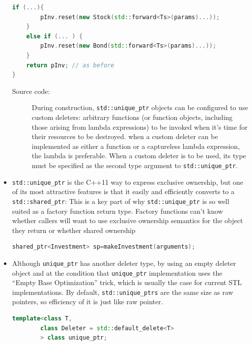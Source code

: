 \documentclass[a4paper,11pt,twoside]{book}
\begin{document}
\begin{itemize}
\begin{lstlisting}[frame=single, language=c++, mathescape=true]
	if (...){
		pInv.reset(new Stock(std::forward<Ts>(params)...));
	}
	else if (... ) {
		pInv.reset(new Bond(std::forward<Ts>(params)...));
	}
	return pInv; // as before
}
\end{lstlisting}
\begin{description}
    \item[Source code:] During construction, \texttt{std::unique\_ptr} objects can be configured to use custom deleters: arbitrary functions (or function objects, including those arising from lambda expressions) to be invoked when it's time for their resources to be destroyed. when a custom deleter can be implemented as either a function or a captureless lambda expression, the lambda is preferable. When a custom deleter is to be used, its type must be specified as the second type argument to \texttt{std::unique\_ptr}.
\end{description}

    \item \texttt{std::unique\_ptr} is the C++11 way to express exclusive ownership, but one of its most attractive features is that it easily and efficiently converts to a \texttt{std::shared\_ptr}: This is a key part of why \texttt{std::unique\_ptr} is so well suited as a factory function return type. Factory functions can't know whether callers will want to use exclusive ownership semantics for the object they return or whether shared ownership
\begin{lstlisting}[frame=single, language=c++, mathescape=true]
shared_ptr<Investment> sp=makeInvestment(arguments); 
\end{lstlisting}

    \item Although \texttt{unique\_ptr} has another deleter type, by using an empty deleter object and at the condition that \texttt{unique\_ptr} implementation uses the “Empty Base Optimization” trick, which is usually the case for current STL implementations. By default, \texttt{std::unique\_ptrs} are the same size as raw pointers, so efficiency of it is just like raw pointer.
\begin{lstlisting}[frame=single, language=c++, mathescape=true]
template<class T, 
		class Deleter = std::default_delete<T>
		> class unique_ptr;
\end{lstlisting}

\end{itemize}
\end{document}
